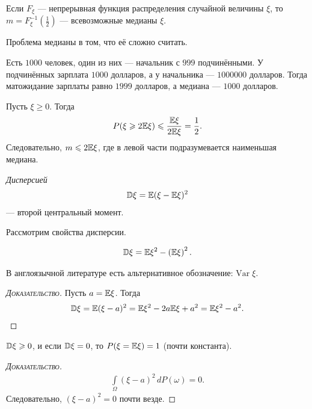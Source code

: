 \begin{remrk*}
 Если $ F_\xi $ --- непрерывная функция распределения случайной величины $ \xi $, то $ m = F_\xi^{-1}(\frac{1}{2}) $ --- всевозможные медианы $ \xi $.
\end{remrk*}

Проблема медианы в том, что её сложно считать.

\begin{exmpl*}
 Есть $ 1000 $ человек, один из них --- начальник с $ 999 $ подчинёнными. У подчинённых зарплата $ 1000 $ долларов, а у начальника --- $ 1000000 $ долларов. Тогда матожидание зарплаты равно $ 1999 $ долларов, а медиана --- $ 1000 $ долларов.
\end{exmpl*}

\begin{remrk}
 Пусть $ \xi \geqslant 0 $. Тогда
 \begin{align*}
  P(\xi \geqslant 2\mathbb E\xi) \leqslant \frac{\mathbb E\xi}{2\mathbb E\xi} = \frac{1}{2}.
 \end{align*} Следовательно, $ m \leqslant 2\mathbb E\xi $, где в левой части подразумевается наименьшая медиана.
\end{remrk}

\begin{df}[дисперсия]
 \textit{Дисперсией}
 \begin{align*}
  \mathbb D \xi = \mathbb E (\xi - \mathbb E\xi)^{2}
 \end{align*} --- второй центральный момент.
\end{df}

Рассмотрим свойства дисперсии.
\begin{prop}
 \begin{align*}
  \mathbb D\xi = \mathbb E \xi^{2} - \left( \mathbb E \xi \right)^{2}.
 \end{align*} 

 В англоязычной литературе есть альтернативное обозначение: $ \mathrm{Var} \;\xi $.
\end{prop}
\begin{proof}[\normalfont\textsc{Доказательство}]
 Пусть $a = \mathbb E\xi $. Тогда
 \begin{align*}
  \mathbb D\xi = \mathbb E(\xi - a)^{2} = \mathbb E\xi^{2} - 2a \mathbb E\xi + a^{2} = \mathbb E\xi^{2} - a^{2}.
 \end{align*} 
\end{proof}

\begin{prop}
 $ \mathbb D\xi \geqslant 0 $, и если $ \mathbb D\xi = 0 $, то $ P(\xi = \mathbb E\xi) = 1 $ (почти константа).
\end{prop}
\begin{proof}[\normalfont\textsc{Доказательство}]
 \begin{align*}
  \int\limits_{\Omega} (\xi - a)^{2} \,dP(\omega) = 0.
 \end{align*} Следовательно, $ (\xi - a)^{2} = 0 $ почти везде.
\end{proof}


